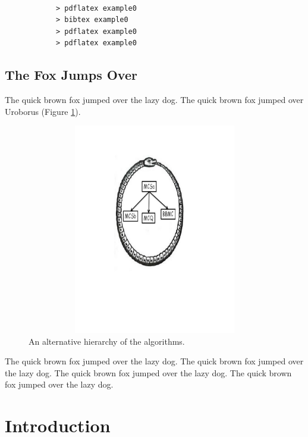 \documentclass{l4proj}
\theoremstyle{definition}
\begin{document}
\begin{verbatim}

            > pdflatex example0
            > bibtex example0
            > pdflatex example0
            > pdflatex example0

\end{verbatim}

\section{The Fox Jumps Over}
The quick brown fox jumped over the lazy dog.
The quick brown fox jumped over Uroborus (Figure \ref{uroborus}).


\begin{figure}
\centering
\includegraphics[height=9.2cm,width=13.2cm]{uroboros.pdf}
\vspace{-30mm}
\caption{An alternative hierarchy of the algorithms.}
\label{uroborus}
\end{figure}

The quick brown fox jumped over the \cite{ctindex} lazy dog. \cite{rdds}
The quick brown fox jumped over the lazy dog. \cite{freqStructBasedIndexing}
The quick brown fox jumped over \cite{ckt} the lazy dog.
The quick brown fox jumped over \cite{graphX} the lazy dog.

\chapter{Introduction}
\end{document}
